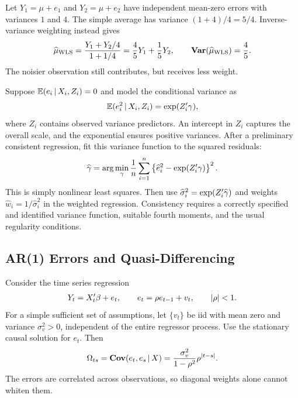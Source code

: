 \documentclass[a4paper,12pt]{article}
\begin{document}
\begin{example}
    Let $Y_1=\mu+e_1$ and $Y_2=\mu+e_2$ have independent mean-zero errors
    with variances $1$ and $4$.
    The simple average has variance $(1+4)/4=5/4$.
    Inverse-variance weighting instead gives
    \begin{align}
        \widehat\mu_{\mathrm{WLS}}
        =\frac{Y_1+Y_2/4}{1+1/4}
        =\frac45Y_1+\frac15Y_2,
        \qquad
        \operatorname{\text{\textrm{\upshape\textbf{Var}}}}(\widehat\mu_{\mathrm{WLS}})=\frac45.
    \end{align}
    The noisier observation still contributes, but receives less weight.
\end{example}

\begin{remark}
	Suppose $\operatorname{\mathbb{E}}(e_i\mathpunct{}|\mathpunct{} X_i,Z_i)=0$ and model the conditional variance as
	\begin{align}
		\operatorname{\mathbb{E}}(e_i^2\mathpunct{}|\mathpunct{} X_i,Z_i)=\exp(Z_i^{\prime}\gamma),
	\end{align}
	where $Z_i$ contains observed variance predictors.
	An intercept in $Z_i$ captures the overall scale, and the exponential ensures positive variances.
	After a preliminary consistent regression, fit this variance function to the squared residuals:
	\begin{align}
		\widehat\gamma
		=\arg\min_\gamma\frac1n\sum_{i=1}^n
		\left\{\widehat e_i^2-\exp(Z_i^{\prime}\gamma)\right\}^2.
	\end{align}
	This is simply nonlinear least squares.
	Then use $\widehat\sigma_i^2=\exp(Z_i^{\prime}\widehat\gamma)$ and weights
	$\widehat w_i=1/\widehat\sigma_i^2$ in the weighted regression.
	Consistency requires a correctly specified and identified variance function,
	suitable fourth moments, and the usual regularity conditions.
\end{remark}

\subsection{AR(1) Errors and Quasi-Differencing}

Consider the time series regression
\begin{align}\label{eq-ar-errors}
    Y_t=X_t^{\prime}\beta+e_t,\qquad
    e_t=\rho e_{t-1}+v_t,\qquad |\rho|<1.
\end{align}
For a simple sufficient set of assumptions, let $\{v_t\}$ be \gls{iid}
with mean zero and variance $\sigma_v^2>0$,
independent of the entire regressor process.
Use the stationary causal solution for $e_t$.
Then
\begin{align}
    \Omega_{ts}=\operatorname{\text{\textrm{\upshape\textbf{Cov}}}}(e_t,e_s\mathpunct{}|\mathpunct{} X)
    =\frac{\sigma_v^2}{1-\rho^2}\rho^{|t-s|}.
\end{align}
The errors are correlated across observations, so diagonal weights alone cannot whiten them.
\end{document}
